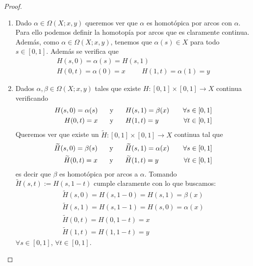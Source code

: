 \begin{lema}
    \begin{proof}\
        \begin{enumerate}
            \item[(i)] Dado $\alpha \in \Omega(X;x,y)$ queremos ver que $\alpha$ es homotópica por arcos con $\alpha$. Para ello podemos definir la homotopía por arcos
            \Func{H}{[0,1]\times[0,1]}{X}{(s,t)}{\alpha(s)}
            que es claramente continua. Además, como $\alpha\in \Omega(X;x,y)$, tenemos que $\alpha(s)\in X$ para todo $s\in [0,1]$. Además se verifica que
            \begin{gather*}
                H(s,0) = \alpha(s)=H(s,1)\\
                H(0,t) = \alpha(0)=x \hspace{1cm} H(1,t) = \alpha(1) = y
            \end{gather*}

            \item[(ii)] Dados $\alpha, \beta\in \Omega(X;x,y)$ tales que existe $H:[0,1]\times [0,1]\to X$ continua verificando
            \begin{align*}
                H(s,0) = \alpha(s) \hspace{0.5cm} &\text{ y } \hspace{0.5cm} H(s,1) = \beta(x) \ \ \ &\forall s\in [0,1]\\
                H(0,t) = x  \hspace{0.5cm} &\text{ y } \hspace{0.5cm} H(1,t) = y \ \ \ &\forall t \in [0,1]
            \end{align*}
            Queremos ver que existe un $\tilde{H}:[0,1]\times[0,1]\to X$ continua tal que 
            \begin{align*}
                \tilde{H}(s,0) = \beta(s) \hspace{0.5cm} &\text{ y } \hspace{0.5cm} \tilde{H}(s,1) = \alpha(x) \ \ \ &\forall s\in [0,1]\\
                \tilde{H}(0,t) = x  \hspace{0.5cm} &\text{ y } \hspace{0.5cm} \tilde{H}(1,t) = y \ \ \ &\forall t \in [0,1]
            \end{align*}
            es decir que $\beta$ es homotópica por arcos a $\alpha$. Tomando $\tilde{H}(s,t):=H(s, 1-t)$ cumple claramente con lo que buscamos:
            \begin{gather*}
                \tilde{H}(s,0) = H(s, 1-0) = H(s,1) = \beta(x)\\
                \tilde{H}(s, 1) = H(s, 1-1) = H(s,0) = \alpha(x)\\
                \tilde{H}(0,t) = H(0, 1-t) = x\\
                \tilde{H}(1,t) = H(1, 1-t) = y
            \end{gather*}
            $\forall s \in [0,1]$, $\forall t \in [0,1]$.


\end{enumerate}
\end{proof}
\end{lema}
